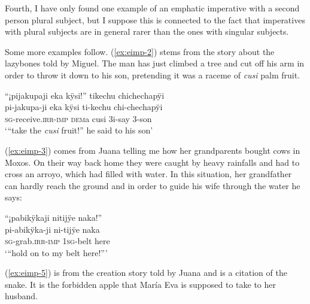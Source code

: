 Fourth, I have only found one example of an emphatic imperative with a second person plural subject, but I suppose this is connected to the fact that imperatives with plural subjects are in general rarer than the ones with singular subjects.

Some more examples follow. (\ref{ex:eimp-2}) stems from the story about the lazybones told by Miguel. The man has just climbed a tree and cut off his arm in order to throw it down to his son, pretending it was a raceme of \textit{cusi} palm fruit.

\ea\label{ex:eimp-2}
\begingl
\glpreamble “¡pijakupaji eka kÿsi!” tikechu chichechapÿi\\
\gla pi-jakupa-ji eka kÿsi ti-kechu chi-chechapÿi\\
\textsc{sg}-receive.\textsc{irr}-\textsc{imp} \textsc{dem}a cusi 3i-say 3-son\\
\glft ‘“take the \textit{cusi} fruit!” he said to his son’
\endgl
\trailingcitation{[mox-n110920l.100]}
\xe

\hspace*{-2.3pt}(\ref{ex:eimp-3}) comes from Juana telling me how her grandparents bought cows in Moxos. On their way back home they were caught by heavy rainfalls and had to cross an arroyo, which had filled with water. In this situation, her grandfather can hardly reach the ground and in order to guide his wife through the water he says:

\newpage
\ea\label{ex:eimp-3}
\begingl
\glpreamble “¡pabikÿkaji nitijÿe naka!”\\
\gla pi-abikÿka-ji ni-tijÿe naka\\
\textsc{sg}-grab.\textsc{irr}-\textsc{imp} 1\textsc{sg}-belt here\\
\glft ‘“hold on to my belt here!”'
\endgl
\trailingcitation{[jxx-p151016l-2.141]}
\xe


(\ref{ex:eimp-5}) is from the creation story told by Juana and is a citation of the snake. It is the forbidden apple that María Eva is supposed to take to her husband.

